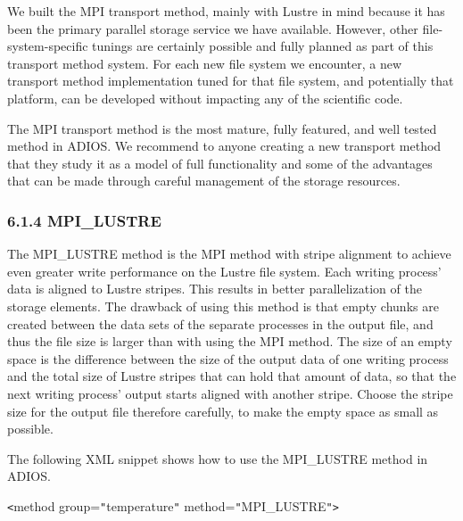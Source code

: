 \vspace{10pt}
We built the MPI transport method, mainly with Lustre in mind because it has been 
the primary parallel storage service we have available. However, other file-system-specific 
tunings are certainly possible and fully planned as part of this transport method 
system. For each new file system we encounter, a new transport method implementation 
tuned for that file system, and potentially that platform, can be developed without 
impacting any of the scientific code.

\vspace{10pt}
The MPI transport method is the most mature, fully featured, and well tested method 
in ADIOS. We recommend to anyone creating a new transport method that they study 
it as a model of full functionality and some of the advantages that can be made 
through careful management of the storage resources.\label{HToc84890260}\label{HToc212016636}\label{HToc212016878}\label{HToc182553384}

\vspace{10pt}
\subsubsection*{{\large \textbf{6.1.4 MPI\_LUSTRE}}}

\vspace{10pt}
The MPI\_LUSTRE method is the MPI method with stripe alignment to achieve even 
greater write performance on the Lustre file system. Each writing process' data 
is aligned to Lustre stripes. This results in better parallelization of the storage 
elements. The drawback of using this method is that empty chunks are created between 
the data sets of the separate processes in the output file, and thus the file size 
is larger than with using the MPI method. The size of an empty space is the difference 
between the size of the output data of one writing process and the total size of 
Lustre stripes that can hold that amount of data, so that the next writing process' 
output starts aligned with another stripe. Choose the stripe size for the output 
file therefore carefully, to make the empty space as small as possible. 

\vspace{10pt}
The following XML snippet shows how to use the MPI\_LUSTRE method in ADIOS. 

\vspace{22pt}
\texttt{<}method group=\texttt{"}temperature\texttt{"} method=\texttt{"}MPI\_LUSTRE\texttt{"}\texttt{>}

